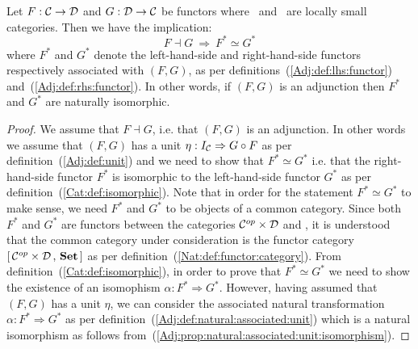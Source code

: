 \begin{prop}\label{Adj:prop:adjunction:F*:G*:iso}
    Let $F:\mbox{$\cal C$}\to\mbox{$\cal D$}$ and $G:\mbox{$\cal D$}\to\mbox{$\cal C$}$ be functors where \Cat\ and \Dat\ 
    are locally small categories. Then we have the implication:
        \[
            F\dashv G\ \Rightarrow\  F^{*}\simeq G^{*}
        \]
    where $F^{*}$ and $G^{*}$ denote the left-hand-side and right-hand-side 
    functors respectively associated with $(F,G)$, as per 
    definitions~(\ref{Adj:def:lhs:functor}) and~(\ref{Adj:def:rhs:functor}). 
    In other words, if $(F,G)$ is an adjunction then $F^{*}$ and $G^{*}$ are 
    naturally isomorphic.
\end{prop}
\begin{proof}
    We assume that $F\dashv G$, i.e. that $(F,G)$ is an adjunction. In other
    words we assume that $(F,G)$ has a unit $\eta:I_{\cal C}\Rightarrow G\circ F$
    as per definition~(\ref{Adj:def:unit}) and we need to show that 
    $F^{*}\simeq G^{*}$ i.e. that the right-hand-side functor $F^{*}$ is 
    isomorphic to the left-hand-side functor $G^{*}$ as per
    definition~(\ref{Cat:def:isomorphic}). Note that in order for the 
    statement $F^{*}\simeq G^{*}$ to make sense, we need $F^{*}$ and $G^{*}$
    to be objects of a common category. Since both $F^{*}$ and $G^{*}$ are
    functors between the categories $\mbox{${\cal C}^{op}$}\times\mbox{$\cal D$}$ and \Set, it is 
    understood that the common category under consideration is the functor
    category $[\,\mbox{${\cal C}^{op}$}\times\mbox{$\cal D$}\,,\,\mbox{\bf Set}\,]$ as per 
    definition~(\ref{Nat:def:functor:category}). From 
    definition~(\ref{Cat:def:isomorphic}), in order to prove that $F^{*}\simeq 
    G^{*}$ we need to show the existence of an isomophism $\alpha:F^{*}
    \Rightarrow G^{*}$. However, having assumed that $(F,G)$ has a unit $\eta$,
    we can consider the associated natural transformation $\alpha : F^{*}
    \Rightarrow G^{*}$ as per definition~(\ref{Adj:def:natural:associated:unit})
    which is a natural isomorphism as follows 
    from~(\ref{Adj:prop:natural:associated:unit:isomorphism}).
\end{proof}
